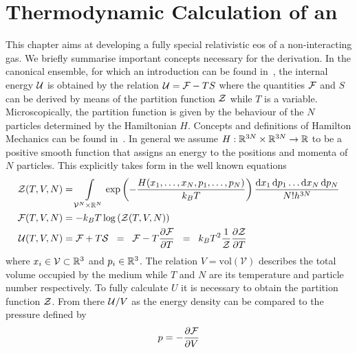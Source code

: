 \section{Thermodynamic Calculation of an \texorpdfstring{}{EoS}}
\label{sec:2-Thermo}
This chapter aims at developing a fully special relativistic \ac{eos} of a non-interacting gas.
We briefly summarise important concepts necessary for the derivation.
In the canonical ensemble, for which an introduction can be found in~\cite{fliessbachStatistischePhysikLehrbuch2018}, the internal energy $\mathcal{U}$ is obtained by the relation $\mathcal{U}=\mathcal{F}-TS$ where the quantities $\mathcal{F}$ and $S$ can be derived by means of the partition function $\mathcal{Z}$ while $T$ is a variable.
Microscopically, the partition function is given by the behaviour of the $N$ particles determined by the Hamiltonian $H$.
Concepts and definitions of Hamilton Mechanics can be found in~\cite{eschrigTopologyGeometryPhysics2011, fliessbachMechanikLehrbuchZur2020, spivakPhysicsMathematiciansMechanics2010}.
In general we assume $H:\mathbb{R}^{3N}\times\mathbb{R}^{3N}\rightarrow\mathbb{R}$ to be a positive smooth function that assigns an energy to the positions and momenta of $N$ particles.
This explicitly takes form in the well known equations
\begin{align}
	\mathcal{Z}(T,V,N) 	&= \int\limits_{\mathcal{V}^N\times\mathbb{R}^N}\exp\left(-\frac{H(x_1,\dots,x_N,p_1,\dots,p_N)}{k_B T}\right)\frac{\mathop{}\!\mathrm{d} x_1\mathop{}\!\mathrm{d} p_1\dots \mathop{}\!\mathrm{d} x_N\mathop{}\!\mathrm{d} p_N}{N!h^{3N}}\\
	\mathcal{F}(T,V,N) 	&= - k_B T\log\left(\mathcal{Z}(T,V,N)\right)\label{2-IntEner-FreeEnerDef}\\
	\mathcal{U}(T,V,N) 	&= \mathcal{F} + T \mathcal{S} \hspace{0.2cm}=\hspace{0.2cm} \mathcal{F} - T\frac{\partial\mathcal{F}}{\partial T} \hspace{0.2cm}=\hspace{0.2cm} k_B T^2\frac{1}{\mathcal{Z}}\frac{\partial\mathcal{Z}}{\partial T}\label{2-IntEner-Def}
\end{align}
where $x_i\in \mathcal{V}\subset\mathbb{R}^3$  and $p_i\in \mathbb{R}^3$.
The relation $V=\text{vol}(\mathcal{V})$ describes the total volume occupied by the medium while $T$ and $N$ are its temperature and particle number respectively.
To fully calculate $U$ it is necessary to obtain the partition function $\mathcal{Z}$.
From there $\mathcal{U}/V$ as the energy density can be compared to the pressure defined by
\begin{equation}
	p=-\frac{\partial\mathcal{F}}{\partial V}
	\label{eq:2-IntEner-pressureDef}
\end{equation}
